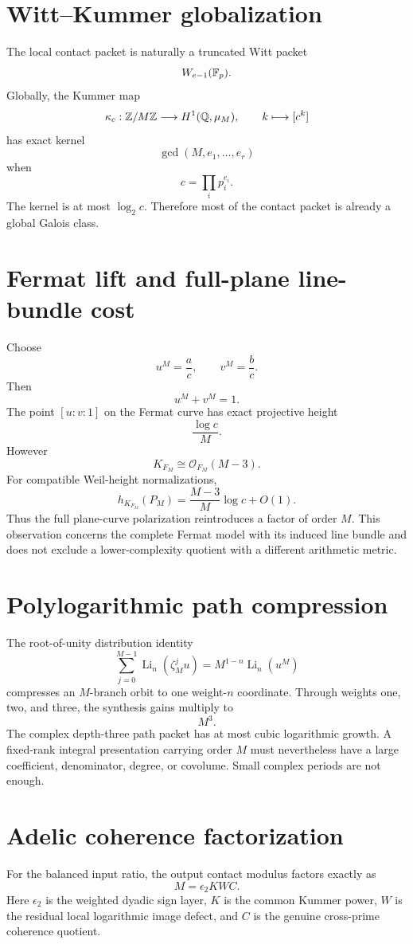 \section{Witt--Kummer globalization}
The local contact packet is naturally a truncated Witt packet
\[
W_{e-1}(\mathbb F_p).
\]
Globally, the Kummer map
\[
\kappa_c:\mathbb Z/M\mathbb Z\longrightarrow H^1(\mathbb Q,\mu_M),
\qquad
k\longmapsto[c^k]
\]
has exact kernel
\[
\boxed{
\gcd(M,e_1,\ldots,e_r)
}
\]
when
\[
c=\prod_ip_i^{e_i}.
\]
The kernel is at most $\log_2c$. Therefore most of the contact packet is already a global Galois class.

\section{Fermat lift and full-plane line-bundle cost}
Choose
\[
u^M=\frac ac,
\qquad
v^M=\frac bc.
\]
Then
\[
u^M+v^M=1.
\]
The point $[u:v:1]$ on the Fermat curve has exact projective height
\[
\boxed{
\frac{\log c}{M}.
}
\]
However
\[
K_{F_M}\cong\mathcal O_{F_M}(M-3).
\]
For compatible Weil-height normalizations,
\[
h_{K_{F_M}}(P_M)
=
\frac{M-3}{M}\log c+O(1).
\]
Thus the full plane-curve polarization reintroduces a factor of order $M$. This observation concerns the complete Fermat model with its induced line bundle and does not exclude a lower-complexity quotient with a different arithmetic metric.

\section{Polylogarithmic path compression}
The root-of-unity distribution identity
\[
\boxed{
\sum_{j=0}^{M-1}\operatorname{Li}_n(\zeta_M^ju)
=
M^{1-n}\operatorname{Li}_n(u^M)
}
\]
compresses an $M$-branch orbit to one weight-$n$ coordinate. Through weights one, two, and three, the synthesis gains multiply to
\[
M^3.
\]
The complex depth-three path packet has at most cubic logarithmic growth. A fixed-rank integral presentation carrying order $M$ must nevertheless have a large coefficient, denominator, degree, or covolume. Small complex periods are not enough.

\section{Adelic coherence factorization}
For the balanced input ratio, the output contact modulus factors exactly as
\[
\boxed{
M=\epsilon_2KWC.
}
\]
Here $\epsilon_2$ is the weighted dyadic sign layer, $K$ is the common Kummer power, $W$ is the residual local logarithmic image defect, and $C$ is the genuine cross-prime coherence quotient.

